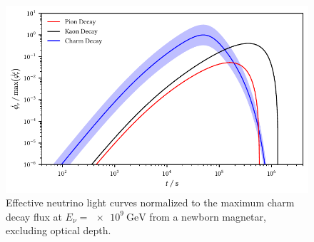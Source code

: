 \begin{figure}[H]
	\centering
	\includegraphics{../plots/build/magnetar_neutrino_spectrum_without.pdf}
	\caption[Magnetar $\nu \kern+0.5pt$ flux compared to $c$ decay without optical depth.]
			{Effective neutrino light curves normalized to the maximum charm decay flux at
			 $E_\nu = \qty{e9}{\giga\electronvolt}$ from a newborn magnetar, excluding optical depth.}
	\label{fig:magnetar-flux-without}
\end{figure}
